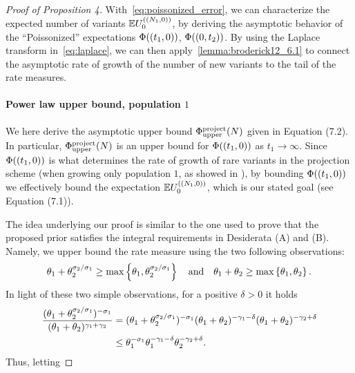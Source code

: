\begin{proof}[Proof of Proposition 4]
With~\cref{eq:poissonized_error}, we can characterize the expected number of variants $\E \news{\zerovec}{(N_1,0)}$, by deriving the asymptotic behavior of the ``Poissonized'' expectations $\Phi((t_1,0))$, $\Phi((0,t_2))$. By using the Laplace transform in~\cref{eq:laplace}, we can then apply~\cref{lemma:broderick12_6.1} to connect the asymptotic rate of growth of the number of new variants to the tail of the rate measures. 

\paragraph{Power law upper bound, population $1$}
We here derive the asymptotic upper bound $\upperboundproject (\vecsamplesize)$ given in Equation (7.2).
In particular, $\upperboundproject (\vecsamplesize)$ is an upper bound for $\Phi((t_1,0))$ as $t_1 \to \infty$. 
Since $\Phi((t_1,0))$ is what determines the rate of growth of rare variants in the projection scheme (when growing only population $1$, as showed in \citet[Lemma 6.3]{Broderick2012}), by bounding $\Phi((t_1,0))$ we effectively bound the expectation $\E \news{\zerovec}{(N_1,0)}$, which is our stated goal (see Equation (7.1)).

The idea underlying our proof is similar to the one used to prove that the proposed prior satisfies the integral requirements in Desiderata (A) and (B). 
Namely, we upper bound the rate measure using the two following observations:
\begin{align}
	\theta_{1}+\theta_{2}^{\sigma_{2}/\sigma_{1}}\ge \max\left\{ \theta_{1}, \theta_{2}^{\sigma_{2}/\sigma_{1}} \right\}
	\quad\text{and}\quad
	\theta_{1}+\theta_{2}\ge \max\left\{ \theta_{1}, \theta_{2} \right\}.
\label{eq:bounds_ineq}
\end{align}
In light of these two simple observations, for a positive $\delta>0$ it holds
\begin{align*}
    \frac{(\theta_{1}+\theta_{2}^{\sigma_{2}/\sigma_{1}})^{-\sigma_{1}}}{(\theta_{1}+\theta_{2})^{\gamma_{1}+\gamma_{2}}}&=(\theta_{1}+\theta_{2}^{\sigma_{2}/\sigma_{1}})^{-\sigma_{1}}(\theta_{1}+\theta_{2})^{-\gamma_{1}-\delta}(\theta_{1}+\theta_{2})^{-\gamma_{2}+\delta}\\
    &\le \theta_{1}^{-\sigma_{1}}\theta_{1}^{-\gamma_{1}-\delta}\theta_{2}^{-\gamma_{2}+\delta}.
\end{align*}
 Thus, letting


\end{proof}
